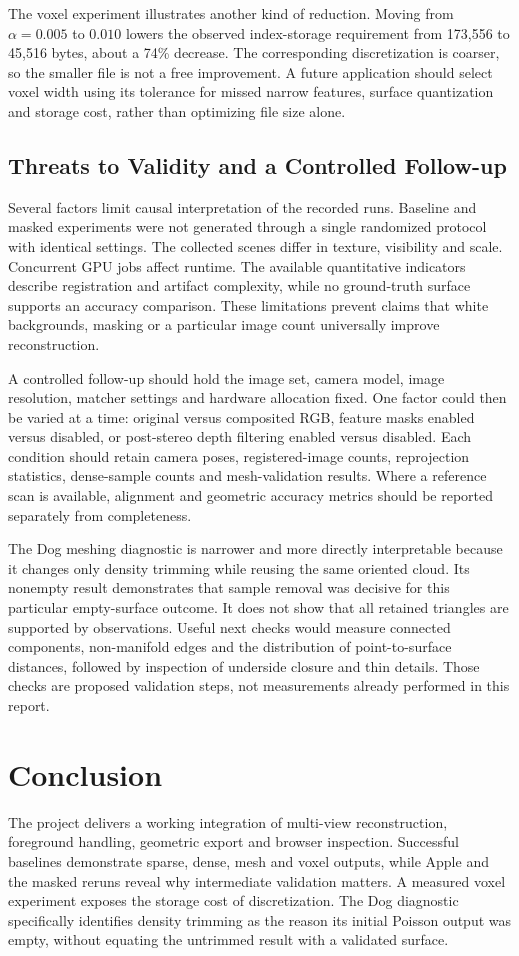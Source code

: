 \documentclass[conference]{IEEEtran}
\begin{document}
The voxel experiment illustrates another kind of reduction. Moving from $\alpha=0.005$ to $0.010$ lowers the observed index-storage requirement from 173,556 to 45,516 bytes, about a 74\% decrease. The corresponding discretization is coarser, so the smaller file is not a free improvement. A future application should select voxel width using its tolerance for missed narrow features, surface quantization and storage cost, rather than optimizing file size alone.

\subsection{Threats to Validity and a Controlled Follow-up}
Several factors limit causal interpretation of the recorded runs. Baseline and masked experiments were not generated through a single randomized protocol with identical settings. The collected scenes differ in texture, visibility and scale. Concurrent GPU jobs affect runtime. The available quantitative indicators describe registration and artifact complexity, while no ground-truth surface supports an accuracy comparison. These limitations prevent claims that white backgrounds, masking or a particular image count universally improve reconstruction.

A controlled follow-up should hold the image set, camera model, image resolution, matcher settings and hardware allocation fixed. One factor could then be varied at a time: original versus composited RGB, feature masks enabled versus disabled, or post-stereo depth filtering enabled versus disabled. Each condition should retain camera poses, registered-image counts, reprojection statistics, dense-sample counts and mesh-validation results. Where a reference scan is available, alignment and geometric accuracy metrics should be reported separately from completeness.

The Dog meshing diagnostic is narrower and more directly interpretable because it changes only density trimming while reusing the same oriented cloud. Its nonempty result demonstrates that sample removal was decisive for this particular empty-surface outcome. It does not show that all retained triangles are supported by observations. Useful next checks would measure connected components, non-manifold edges and the distribution of point-to-surface distances, followed by inspection of underside closure and thin details. Those checks are proposed validation steps, not measurements already performed in this report.

\balance
\section{Conclusion}
The project delivers a working integration of multi-view reconstruction, foreground handling, geometric export and browser inspection. Successful baselines demonstrate sparse, dense, mesh and voxel outputs, while Apple and the masked reruns reveal why intermediate validation matters. A measured voxel experiment exposes the storage cost of discretization. The Dog diagnostic specifically identifies density trimming as the reason its initial Poisson output was empty, without equating the untrimmed result with a validated surface.
\end{document}
